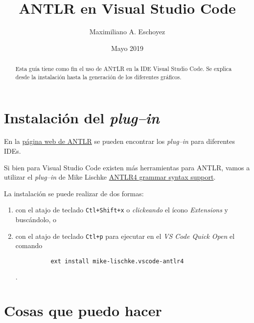 \documentclass[a5paper,10pt]{article}
\author{Maximiliano A. Eschoyez}
\title{ANTLR en Visual Studio Code}
\date{Mayo 2019}
\begin{document}
\maketitle

\begin{abstract}
	Esta guía tiene como fin el uso de ANTLR en la IDE Visual Studio Code. Se explica desde la instalación hasta la generación de los diferentes gráficos.
\end{abstract}

\section{Instalación del \emph{plug--in}}

En la \href{https://www.antlr.org/tools.html}{página web de ANTLR} se pueden encontrar los \emph{plug--in} para diferentes IDEs.

Si bien para Visual Studio Code existen más herramientas para ANTLR, vamos a utilizar el \emph{plug--in} de Mike Lischke \href{https://marketplace.visualstudio.com/items?itemName=mike-lischke.vscode-antlr4}{ANTLR4 grammar syntax support}.

La instalación se puede realizar de dos formas:
\begin{enumerate}
	\item con el atajo de teclado \verb|Ctl+Shift+x| o \emph{clickeando} el ícono \emph{Extensions} y buscándolo, o
    \item con el atajo de teclado \verb|Ctl+p| para ejecutar en el \emph{VS Code Quick Open} el comando
    \begin{verbatim}
	      ext install mike-lischke.vscode-antlr4
	\end{verbatim}.
\end{enumerate}


\section{Cosas que puedo hacer}
\end{document}
